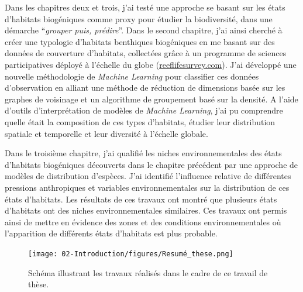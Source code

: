 \begin{refsection}
Dans les chapitres deux et trois, j'ai testé une approche se basant sur
les états d'habitats biogéniques comme proxy pour étudier la
biodiversité, dans une démarche ``\emph{grouper puis, prédire}''. Dans
le second chapitre, j'ai ainsi cherché à créer une typologie d'habitats
benthiques biogéniques en me basant sur des données de couverture
d'habitats, collectées grâce à un programme de sciences participatives
déployé à l'échelle du globe
(\href{https://reeflifesurvey.com}{reeflifesurvey.com}). J'ai développé
une nouvelle méthodologie de \emph{Machine Learning} pour classifier ces
données d'observation en alliant une méthode de réduction de dimensions
basée sur les graphes de voisinage et un algorithme de groupement basé
sur la densité. A l'aide d'outils d'interprétation de modèles de
\emph{Machine Learning}, j'ai pu comprendre quelle était la composition
de ces types d'habitats, étudier leur distribution spatiale et
temporelle et leur diversité à l'échelle globale.

\pagebreak

Dans le troisième chapitre, j'ai qualifié les niches environnementales
des états d'habitats biogéniques découverts dans le chapitre précédent
par une approche de modèles de distribution d'espèces. J'ai identifié
l'influence relative de différentes pressions anthropiques et variables
environnementales sur la distribution de ces états d'habitats. Les
résultats de ces travaux ont montré que plusieurs états d'habitats ont
des niches environnementales similaires. Ces travaux ont permis ainsi de
mettre en évidence des zones et des conditions environnementales où
l'apparition de différents états d'habitats est plus probable.

\begin{figure}
\hypertarget{fig:intro11}{%
\centering
\texttt{[image: 02-Introduction/figures/Resumé\_these.png]}
\caption{Schéma illustrant les travaux réalisés dans le cadre de ce
travail de thèse.}\label{fig:intro11}
}
\end{figure}

\printbibliography[heading=subbibintoc, title={Bibliographie}]
\end{refsection}